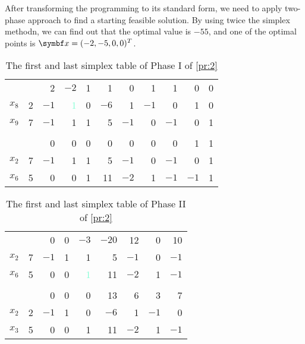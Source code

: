 \documentclass{assignment}[2019/10/15]
\newcommand{\basis}[1]{\textcolor{Aquamarine}{#1}}
\begin{document}
    \begin{solution}
        After transforming the programming to its standard form, we need to apply two-phase approach to find a starting feasible solution. By using twice the simplex methodn, we can find out that the optimal value is $-55$, and one of the optimal points is $\vect{x} = (-2, -5, 0, 0)^T$.
    \end{solution}
    \begin{table}[htb]
        \begin{center}
            \caption{The first and last simplex table of Phase I of \ref{pr:2}}
            \begin{tabularx}{14cm}{cR|*{9}{R}}
                \toprule
                & & 2 & $-2$ & 1 & 1 & 0 & 1 & 1 & 0 & 0\\
                $x_8$ & 2 & $-1$ & \basis{1} & 0 & $-6$ & 1 & $-1$ & 0 & 1 & 0\\
                $x_9$ & 7 & $-1$ & 1 & 1 & 5 & $-1$ & 0 & $-1$ & 0 & 1\\
                \midrule \\ \midrule
                & & 0 & 0 & 0 & 0 & 0 & 0 & 0 & 1 & 1\\
                $x_2$ & 7 & $-1$ & 1 & 1 & 5 & $-1$ & 0 & $-1$ & 0 & 1\\
                $x_6$ & 5 & 0 & 0 & 1 & 11 & $-2$ & 1 & $-1$ & $-1$ & 1\\
                \bottomrule
            \end{tabularx}
        \end{center}
    \end{table}
    \begin{table}[htb]
        \begin{center}
            \caption{The first and last simplex table of Phase II of \ref{pr:2}}
            \begin{tabularx}{14cm}{cR|*{7}{R}}
                \toprule
                & & 0 & 0 & $-3$ & $-20$ & 12 & 0 & 10\\
                $x_2$ & 7 & $-1$ & 1 & 1 & 5 & $-1$ & 0 & $-1$\\
                $x_6$ & 5 & 0 & 0 & \basis{1} & 11 & $-2$ & 1 & $-1$\\
                \midrule \\ \midrule
                & & 0 & 0 & 0 & 13 & 6 & 3 & 7 \\
                $x_2$ & 2 & $-1$ & 1 & 0 & $-6$ & 1 & $-1$ & 0\\
                $x_3$ & 5 & 0 & 0 & 1 & 11 & $-2$ & 1 & $-1$\\
                \bottomrule
            \end{tabularx}
        \end{center}
    \end{table}
\end{document}
